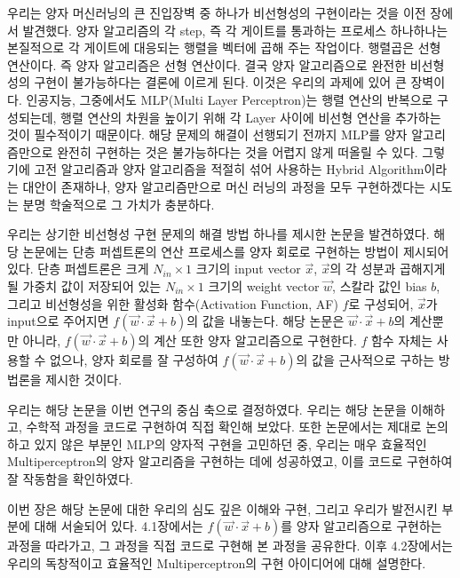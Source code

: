 우리는 양자 머신러닝의 큰 진입장벽 중 하나가 비선형성의 구현이라는 것을 이전 장에서 발견했다.
양자 알고리즘의 각 step, 즉 각 게이트를 통과하는 프로세스 하나하나는 본질적으로 각 게이트에 대응되는 행렬을 벡터에 곱해 주는 작업이다.
행렬곱은 선형 연산이다. 즉 양자 알고리즘은 선형 연산이다. 결국 양자 알고리즘으로 완전한 비선형성의 구현이 불가능하다는 결론에 이르게 된다. 이것은 우리의 과제에 있어 큰 장벽이다.
인공지능, 그중에서도 MLP(Multi Layer Perceptron)는 행렬 연산의 반복으로 구성되는데, 행렬 연산의 차원을 높이기 위해 각 Layer 사이에 비선형 연산을 추가하는 것이 필수적이기 때문이다.
해당 문제의 해결이 선행되기 전까지 MLP를 양자 알고리즘만으로 완전히 구현하는 것은 불가능하다는 것을 어렵지 않게 떠올릴 수 있다.
그렇기에 고전 알고리즘과 양자 알고리즘을 적절히 섞어 사용하는 Hybrid Algorithm이라는 대안이 존재하나, 양자 알고리즘만으로 머신 러닝의 과정을 모두 구현하겠다는 시도는 분명 학술적으로 그 가치가 충분하다.

우리는 상기한 비선형성 구현 문제의 해결 방법 하나를 제시한 논문을 발견하였다.
해당 논문에는 단층 퍼셉트론의 연산 프로세스를 양자 회로로 구현하는 방법이 제시되어 있다.
단층 퍼셉트론은 크게 \(N_{in} \times 1\) 크기의 input vector \(\vec{x}\),
\(\vec{x}\)의 각 성분과 곱해지게 될 가중치 값이 저장되어 있는 \(N_{in} \times 1\) 크기의 weight vector \(\vec{w}\),
스칼라 값인 bias \(b\), 그리고 비선형성을 위한 활성화 함수(Activation Function, AF) \(f\)로 구성되어,
\(\vec{x}\)가 input으로 주어지면 \(f(\vec{w}\cdot\vec{x}+b)\)의 값을 내놓는다.
해당 논문은 \(\vec{w}\cdot\vec{x}+b\)의 계산뿐만 아니라, \(f(\vec{w}\cdot\vec{x}+b)\)의 계산 또한 양자 알고리즘으로 구현한다.
\(f\) 함수 자체는 사용할 수 없으나, 양자 회로를 잘 구성하여 \(f(\vec{w}\cdot\vec{x}+b)\)의 값을 근사적으로 구하는 방법론을 제시한 것이다.

우리는 해당 논문을 이번 연구의 중심 축으로 결정하였다.
우리는 해당 논문을 이해하고, 수학적 과정을 코드로 구현하여 직접 확인해 보았다.
또한 논문에서는 제대로 논의하고 있지 않은 부분인 MLP의 양자적 구현을 고민하던 중, 우리는 매우 효율적인 Multiperceptron의 양자 알고리즘을 구현하는 데에 성공하였고, 이를 코드로 구현하여 잘 작동함을 확인하였다.

이번 장은 해당 논문에 대한 우리의 심도 깊은 이해와 구현, 그리고 우리가 발전시킨 부분에 대해 서술되어 있다.
4.1장에서는 \(f(\vec{w}\cdot\vec{x}+b)\)를 양자 알고리즘으로 구현하는 과정을 따라가고, 그 과정을 직접 코드로 구현해 본 과정을 공유한다.
이후 4.2장에서는 우리의 독창적이고 효율적인 Multiperceptron의 구현 아이디어에 대해 설명한다.

